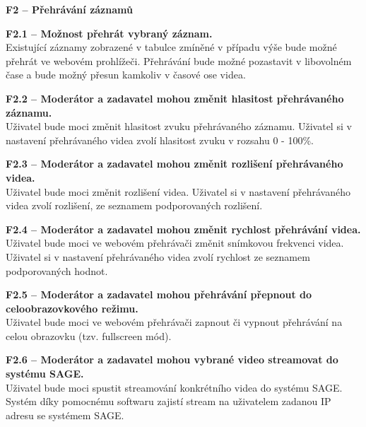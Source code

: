 \documentclass[thesis=M,czech]{FITthesis}[2012/06/26]
\begin{document}
\begin{description}
  \item \textbf{F2 -- Přehrávání záznamů}
  \begin{description}
    \item \textbf{F2.1 -- Možnost přehrát vybraný záznam.\\}
    Existující záznamy zobrazené v tabulce zmíněné v případu výše bude možné přehrát ve webovém prohlížeči. Přehrávání bude možné pozastavit v libovolném čase a bude možný přesun kamkoliv v časové ose videa.
    \item \textbf{F2.2 -- Moderátor a zadavatel mohou změnit hlasitost přehrávaného záznamu.\\}
	Uživatel bude moci změnit hlasitost zvuku přehrávaného záznamu. Uživatel si v nastavení přehrávaného videa zvolí hlasitost zvuku v rozsahu 0 - 100\%.
    \item \textbf{F2.3 -- Moderátor a zadavatel mohou změnit rozlišení přehrávaného videa.\\}
    Uživatel bude moci změnit rozlišení videa. Uživatel si v nastavení přehrávaného videa zvolí rozlišení, ze seznamem podporovaných rozlišení.
    \item \textbf{F2.4 -- Moderátor a zadavatel mohou změnit rychlost přehrávání videa.\\}
    Uživatel bude moci ve webovém přehrávači změnit snímkovou frekvenci videa. Uživatel si v nastavení přehrávaného videa zvolí rychlost ze seznamem podporovaných hodnot.
    \item \textbf{F2.5 -- Moderátor a zadavatel mohou přehrávání přepnout do celoobrazovkového režimu.\\}
    Uživatel bude moci ve webovém přehrávači zapnout či vypnout přehrávání na celou obrazovku (tzv. fullscreen mód).
    \item \textbf{F2.6 -- Moderátor a zadavatel mohou vybrané video streamovat do systému SAGE.\\}
	Uživatel bude moci spustit streamování konkrétního videa do systému SAGE. Systém díky pomocnému softwaru zajistí stream na uživatelem zadanou IP adresu se systémem SAGE.
  \end{description}


\end{description}
\end{document}
